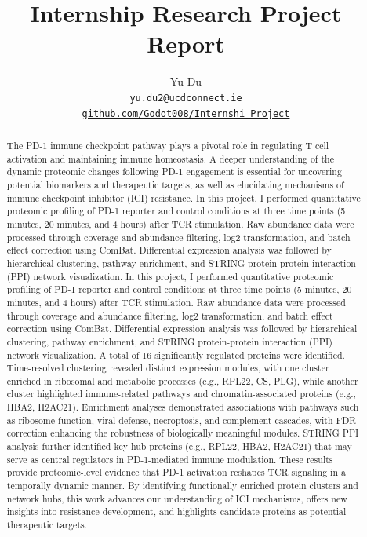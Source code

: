 \documentclass{article}
\title{Internship Research Project Report}
\author{%
  Yu Du \\
  \texttt{yu.du2@ucdconnect.ie} \\
  \href{https://github.com/Godot008/UCD_MEIN40420_Internship_Research_Project_2024-25-Summer}{\texttt{github.com/Godot008/Internshi\_Project}}
}
\begin{document}
  \maketitle

  \begin{abstract}
    The PD-1 immune checkpoint pathway plays a pivotal role in regulating T cell activation and maintaining immune homeostasis. A deeper understanding of the dynamic proteomic changes following PD-1 engagement is essential for uncovering potential biomarkers and therapeutic targets, as well as elucidating mechanisms of immune checkpoint inhibitor (ICI) resistance. In this project, I performed quantitative proteomic profiling of PD-1 reporter and control conditions at three time points (5 minutes, 20 minutes, and 4 hours) after TCR stimulation. Raw abundance data were processed through coverage and abundance filtering, log2 transformation, and batch effect correction using ComBat. Differential expression analysis was followed by hierarchical clustering, pathway enrichment, and STRING protein-protein interaction (PPI) network visualization. In this project, I performed quantitative proteomic profiling of PD-1 reporter and control conditions at three time points (5 minutes, 20 minutes, and 4 hours) after TCR stimulation. Raw abundance data were processed through coverage and abundance filtering, log2 transformation, and batch effect correction using ComBat. Differential expression analysis was followed by hierarchical clustering, pathway enrichment, and STRING protein-protein interaction (PPI) network visualization. A total of 16 significantly regulated proteins were identified. Time-resolved clustering revealed distinct expression modules, with one cluster enriched in ribosomal and metabolic processes (e.g., RPL22, CS, PLG), while another cluster highlighted immune-related pathways and chromatin-associated proteins (e.g., HBA2, H2AC21). Enrichment analyses demonstrated associations with pathways such as ribosome function, viral defense, necroptosis, and complement cascades, with FDR correction enhancing the robustness of biologically meaningful modules. STRING PPI analysis further identified key hub proteins (e.g., RPL22, HBA2, H2AC21) that may serve as central regulators in PD-1-mediated immune modulation. These results provide proteomic-level evidence that PD-1 activation reshapes TCR signaling in a temporally dynamic manner. By identifying functionally enriched protein clusters and network hubs, this work advances our understanding of ICI mechanisms, offers new insights into resistance development, and highlights candidate proteins as potential therapeutic targets.
  \end{abstract}
\end{document}
